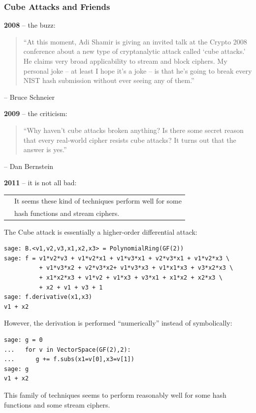 \documentclass[9pt]{beamer}
\begin{document}
\begin{frame}
\frametitle{Cube Attacks and Friends}

\textbf{2008} -- the buzz:

\vspace{0.8em}

\begin{quote}
``At this moment, Adi Shamir is giving an invited talk at the Crypto 2008 conference about a new type of cryptanalytic attack called `cube attacks.' He claims very broad applicability to stream and block ciphers. My personal joke -- at least I hope it's a joke -- is that he's going to break every NIST hash submission without ever seeing any of them.''
\end{quote}
\begin{flushright}
\vspace{-2em}
-- Bruce Schneier
\end{flushright}

\textbf{2009} -- the criticism:


\begin{quote}
 ``Why haven't cube attacks broken anything? Is there some secret reason that every real-world cipher resists cube attacks? It turns out that the answer is yes.''
\end{quote}
\begin{flushright}
\vspace{-2em}
-- Dan Bernstein
\end{flushright}

\textbf{2011} -- it is not all bad:

\vspace{0.8em}

\begin{tabular}{ll}
\hspace{0.05cm} & It seems these kind of techniques perform well for some\\ & hash functions and stream ciphers.
\end{tabular}

\framebreak

The Cube attack is essentially a higher-order differential attack:
\begin{lstlisting}
sage: B.<v1,v2,v3,x1,x2,x3> = PolynomialRing(GF(2)) 
sage: f = v1*v2*v3 + v1*v2*x1 + v1*v3*x1 + v2*v3*x1 + v1*v2*x3 \
          + v1*v3*x2 + v2*v3*x2+ v1*v3*x3 + v1*x1*x3 + v3*x2*x3 \
          + x1*x2*x3 + v1*v2 + v1*x3 + v3*x1 + x1*x2 + x2*x3 \
          + x2 + v1 + v3 + 1
sage: f.derivative(x1,x3)
v1 + x2
\end{lstlisting}

However, the derivation is performed ``numerically'' instead of symbolically:
\begin{lstlisting}
sage: g = 0
...   for v in VectorSpace(GF(2),2):
...      g += f.subs(x1=v[0],x3=v[1])
sage: g
v1 + x2
\end{lstlisting}

This family of techniques seems to perform reasonably well for some hash functions and some stream ciphers.

\end{frame}
\end{document}
